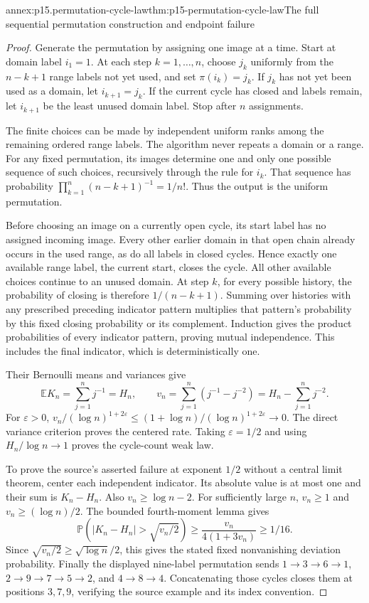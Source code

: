 \begin{annexitem}{annex:p15.permutation-cycle-law}{thm:p15-permutation-cycle-law}{The full sequential permutation construction and endpoint failure}
\begin{proof}
Generate the permutation by assigning one image at a time.
Start at domain label \(i_1=1\). At each step \(k=1,\ldots,n\), choose \(j_k\)
uniformly from the \(n-k+1\) range labels not yet used, and set
\(\pi(i_k)=j_k\). If \(j_k\) has not yet been used as a domain,
let \(i_{k+1}=j_k\). If the current cycle has closed and labels
remain, let \(i_{k+1}\) be the least unused domain label.
Stop after \(n\) assignments.

The finite choices can be made by independent uniform ranks among
the remaining ordered range labels. The algorithm never repeats a
domain or a range. For any fixed permutation, its images determine
one and only one possible sequence of such choices, recursively
through the rule for \(i_k\). That sequence has probability
\(\prod_{k=1}^n(n-k+1)^{-1}=1/n!\).
Thus the output is the uniform permutation.

Before choosing an image on a currently open cycle, its start label
has no assigned incoming image. Every other earlier domain in that
open chain already occurs in the used range, as do all labels in
closed cycles. Hence exactly one available range label, the current
start, closes the cycle. All other available choices continue to an
unused domain. At step \(k\), for every possible history,
the probability of closing is therefore \(1/(n-k+1)\).
Summing over histories with any prescribed preceding indicator
pattern multiplies that pattern's probability by this fixed closing
probability or its complement. Induction gives the product
probabilities of every indicator pattern, proving mutual independence.
This includes the final indicator, which is deterministically one.

Their Bernoulli means and variances give
\[
 \mathbb EK_n=\sum_{j=1}^n j^{-1}=H_n,\qquad
 v_n=\sum_{j=1}^n(j^{-1}-j^{-2})=H_n-\sum_{j=1}^n j^{-2}.
\]
For \(\varepsilon>0\),
\(v_n/(\log n)^{1+2\varepsilon}
\leq(1+\log n)/(\log n)^{1+2\varepsilon}\to0\).
The direct variance criterion proves the centered rate. Taking
\(\varepsilon=1/2\) and using \(H_n/\log n\to1\) proves the
cycle-count weak law.

To prove the source's asserted failure at exponent \(1/2\) without
a central limit theorem, center each independent indicator. Its
absolute value is at most one and their sum is \(K_n-H_n\).
Also \(v_n\geq\log n-2\). For sufficiently large \(n\),
\(v_n\geq1\) and \(v_n\geq(\log n)/2\). The bounded fourth-moment
lemma gives
\[
 \mathbb P(|K_n-H_n|>\sqrt{v_n/2})
       \geq\frac{v_n}{4(1+3v_n)}\geq1/16.
\]
Since \(\sqrt{v_n/2}\geq\sqrt{\log n}/2\), this gives the
stated fixed nonvanishing deviation probability.
Finally the displayed nine-label permutation sends
\(1\to3\to6\to1\), \(2\to9\to7\to5\to2\), and
\(4\to8\to4\). Concatenating those cycles closes them at
positions \(3,7,9\), verifying the source example and its index
convention.
\end{proof}
\end{annexitem}

